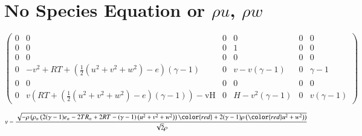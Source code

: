 \documentclass[letterpaper,11pt,nointlimits,reqno]{amsart}
\begin{document}
\section{No Species Equation or $\rho u$, $\rho w$}

\begin{equation}
\left(
\begin{array}{cccccc}
 0 & 0 & 0 & 0 & 0 & 0 \\
 0 & 0 & 0 & 1 & 0 & 0 \\
 0 & 0 & 0 & 0 & 0 & 0 \\
 0 & -v^2+R T+\left(\frac{1}{2} \left(u^2+v^2+w^2\right)-e\right) (\gamma -1) & 0 & v-v (\gamma -1) & 0 & \gamma -1 \\
 0 & 0 & 0 & 0 & 0 & 0 \\
 0 & v \left(R T+\left(\frac{1}{2} \left(u^2+v^2+w^2\right)-e\right) (\gamma -1)\right)-\text{vH} & 0 & H-v^2 (\gamma -1) & 0 & v (\gamma -1)
\end{array}
\right)
\end{equation}

\begin{equation}
v-\frac{\sqrt{-\rho  \left(\rho _{\alpha } \left(2 (\gamma -1)
					    e_{\alpha}-2 T R_{\alpha }+2
					    R T-(\gamma -1)
					    \left(u^2+v^2+w^2\right)\right)
{\color{red} +2 (\gamma -1) \rho} \left( {\color{red} u^2+w^2} \right) \right) }}{\sqrt{2} \rho }  
\end{equation}
\end{document}
